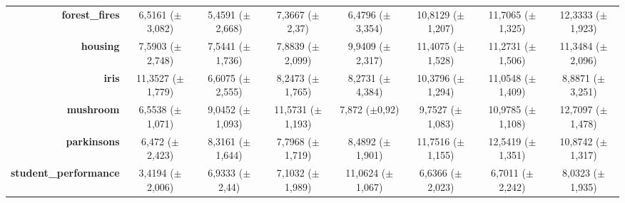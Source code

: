 \documentclass[preprint,review,12pt]{elsarticle}
\begin{document}
\begin{table}[!tb]
{\begin{tabular}{r|c|c|ccccc|}
			\textbf{forest\_fires}        & \cellcolor[rgb]{ 1,  .859,  .506}6,5161 ($\pm$3,082)                              & \cellcolor[rgb]{ .898,  .89,  .51}5,4591 ($\pm$2,668)   & \cellcolor[rgb]{ .996,  .796,  .494}7,3667 ($\pm$2,37)   & \cellcolor[rgb]{ 1,  .863,  .51}6,4796 ($\pm$3,354)      & \cellcolor[rgb]{ .98,  .529,  .443}10,8129 ($\pm$1,207)  & \cellcolor[rgb]{ .976,  .463,  .431}11,7065 ($\pm$1,325) & \cellcolor[rgb]{ .973,  .412,  .42}12,3333 ($\pm$1,923)  \\
			\textbf{housing}              & \cellcolor[rgb]{ 1,  .918,  .518}7,5903 ($\pm$2,748)                              & \cellcolor[rgb]{ 1,  .922,  .518}7,5441 ($\pm$1,736)    & \cellcolor[rgb]{ 1,  .878,  .51}7,8839 ($\pm$2,099)      & \cellcolor[rgb]{ .984,  .608,  .459}9,9409 ($\pm$2,317)  & \cellcolor[rgb]{ .973,  .412,  .42}11,4075 ($\pm$1,528)  & \cellcolor[rgb]{ .976,  .431,  .424}11,2731 ($\pm$1,506) & \cellcolor[rgb]{ .976,  .42,  .424}11,3484 ($\pm$2,096)  \\
			\textbf{iris}                 & \cellcolor[rgb]{ .973,  .412,  .42}11,3527 ($\pm$1,779)                           & \cellcolor[rgb]{ 1,  .922,  .518}6,6075 ($\pm$2,555)    & \cellcolor[rgb]{ .992,  .749,  .486}8,2473 ($\pm$1,765)  & \cellcolor[rgb]{ .992,  .745,  .486}8,2731 ($\pm$4,384)  & \cellcolor[rgb]{ .98,  .518,  .443}10,3796 ($\pm$1,294)  & \cellcolor[rgb]{ .976,  .447,  .427}11,0548 ($\pm$1,409) & \cellcolor[rgb]{ .988,  .678,  .471}8,8871 ($\pm$3,251)  \\
			\textbf{mushroom}             & \cellcolor[rgb]{ 1,  .922,  .518}6,5538 ($\pm$1,071)                              & \cellcolor[rgb]{ .992,  .718,  .478}9,0452 ($\pm$1,093) & \cellcolor[rgb]{ .98,  .51,  .439}11,5731 ($\pm$1,193)   & \cellcolor[rgb]{ .996,  .816,  .498}7,872 ($\pm$0,92)    & \cellcolor[rgb]{ .988,  .659,  .471}9,7527 ($\pm$1,083)  & \cellcolor[rgb]{ .98,  .557,  .451}10,9785 ($\pm$1,108)  & \cellcolor[rgb]{ .973,  .412,  .42}12,7097 ($\pm$1,478)  \\
			\textbf{parkinsons}           & \cellcolor[rgb]{ .875,  .882,  .51}6,472 ($\pm$2,423)                             & \cellcolor[rgb]{ .996,  .843,  .506}8,3161 ($\pm$1,644) & \cellcolor[rgb]{ 1,  .898,  .514}7,7968 ($\pm$1,719)     & \cellcolor[rgb]{ .996,  .827,  .502}8,4892 ($\pm$1,901)  & \cellcolor[rgb]{ .98,  .494,  .435}11,7516 ($\pm$1,155)  & \cellcolor[rgb]{ .973,  .412,  .42}12,5419 ($\pm$1,351)  & \cellcolor[rgb]{ .984,  .584,  .455}10,8742 ($\pm$1,317) \\
			\textbf{student\_performance} & \cellcolor[rgb]{ .514,  .78,  .486}3,4194 ($\pm$2,006)                            & \cellcolor[rgb]{ 1,  .902,  .514}6,9333 ($\pm$2,44)     & \cellcolor[rgb]{ 1,  .886,  .514}7,1032 ($\pm$1,989)     & \cellcolor[rgb]{ .98,  .537,  .443}11,0624 ($\pm$1,067)  & \cellcolor[rgb]{ .988,  .918,  .514}6,6366 ($\pm$2,023)  & \cellcolor[rgb]{ 1,  .922,  .518}6,7011 ($\pm$2,242)     & \cellcolor[rgb]{ .996,  .804,  .498}8,0323 ($\pm$1,935)  \\

\end{tabular}}
\end{table}
\end{document}
